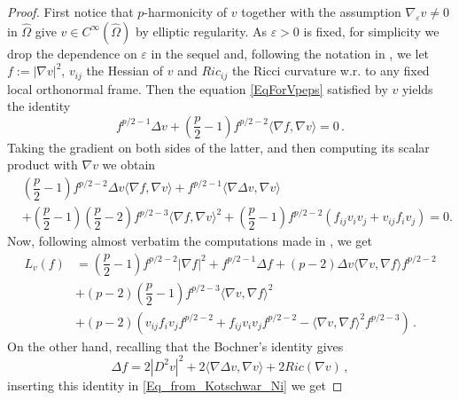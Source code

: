 \documentclass[10pt]{amsart}
\numberwithin{equation}{section}
\theoremstyle{definition}
\begin{document}
\begin{proof}
First notice that $p$-harmonicity of $v$ together with the assumption $\nabla_\varepsilon v \neq 0$ in $\widehat{\Omega}$ give $v \in C^\infty (\widehat{\Omega})$ by elliptic regularity.  As $\varepsilon>0$ is fixed, for simplicity we drop the dependence on $\varepsilon$ in the sequel and, following the notation in  \cite{KotschwarNi}, we let $f:=|\nabla v|^{2}$, $v_{ij}$ the Hessian of $v $ and $Ric_{ij}$ the Ricci curvature w.r. to any fixed local orthonormal frame. Then the equation \eqref{EqForVpeps} satisfied by $v$ yields the identity
\begin{equation}\label{eq:Identity_from_p_harmonicity}
f^{p/2 -1}\Delta v + \left(\dfrac{p}{2}-1\right)f^{p/2-2}\langle \nabla f, \nabla v\rangle =0 \, .
\end{equation}
Taking the gradient on both sides of the latter, and then computing its scalar product with $\nabla v$ we obtain
\begin{equation}\label{Eq:grad_e_scal_prod_eq_per_f}
\begin{aligned}
&\left(\dfrac{p}{2}-1\right)f^{p/2-2}\Delta v \langle \nabla f, \nabla v\rangle + f^{p/2-1}\langle \nabla \Delta v, \nabla v\rangle \\
&+\left(\dfrac{p}{2}-1\right)\left(\dfrac{p}{2}-2\right) f^{p/2-3}\langle \nabla f, \nabla v\rangle^2+\left(\dfrac{p}{2}-1\right) f^{p/2-2}(f_{ij}v_i v_j + v_{ij}f_i v_j) =0.
\end{aligned}
\end{equation}
Now, following almost verbatim the computations made in \cite[Lemma 2.1]{KotschwarNi}, we get 
\begin{equation}\label{Eq_from_Kotschwar_Ni}
\begin{aligned}
L_{v}(f) &= \left(\dfrac{p}{2}-1\right) f^{p/2-2}|\nabla f|^2 + f^{p/2-1}\Delta f + (p-2)\Delta v \langle \nabla v, \nabla f\rangle f^{p/2-2}\\
&+(p-2)\left(\dfrac{p}{2}-1\right) f^{p/2-3}\langle \nabla v,\nabla f\rangle^2\\
&+(p-2) (v_{ij}f_i v_j f^{p/2-2}+ f_{ij}v_i v_j f^{p/2-2}- \langle \nabla v, \nabla f\rangle^2 f^{p/2-3}) \, .
\end{aligned}
\end{equation}
On the other hand, recalling that the Bochner's identity gives
\begin{equation*}
\Delta f =  2|D^2 v |^2 + 2\langle\nabla\Delta v,\nabla v\rangle +2 Ric (\nabla v)  \, ,
\end{equation*}
\noindent  inserting this identity in \eqref{Eq_from_Kotschwar_Ni} we get

\end{proof}
\end{document}
